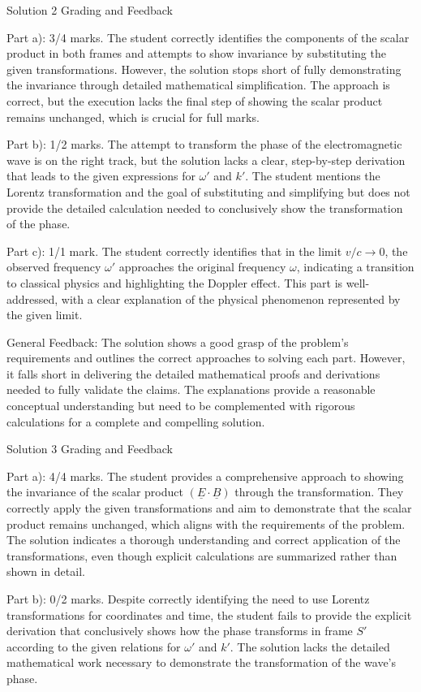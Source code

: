 \documentclass[a4paper,11pt]{article}
\begin{document}
Solution 2 Grading and Feedback

Part a): 3/4 marks. The student correctly identifies the components of the scalar product in both frames and attempts to show invariance by substituting the given transformations. However, the solution stops short of fully demonstrating the invariance through detailed mathematical simplification. The approach is correct, but the execution lacks the final step of showing the scalar product remains unchanged, which is crucial for full marks.

Part b): 1/2 marks. The attempt to transform the phase of the electromagnetic wave is on the right track, but the solution lacks a clear, step-by-step derivation that leads to the given expressions for \( \omega' \) and \( k' \). The student mentions the Lorentz transformation and the goal of substituting and simplifying but does not provide the detailed calculation needed to conclusively show the transformation of the phase.

Part c): 1/1 mark. The student correctly identifies that in the limit \( v/c \rightarrow 0\), the observed frequency \( \omega' \) approaches the original frequency \( \omega \), indicating a transition to classical physics and highlighting the Doppler effect. This part is well-addressed, with a clear explanation of the physical phenomenon represented by the given limit.

General Feedback: The solution shows a good grasp of the problem's requirements and outlines the correct approaches to solving each part. However, it falls short in delivering the detailed mathematical proofs and derivations needed to fully validate the claims. The explanations provide a reasonable conceptual understanding but need to be complemented with rigorous calculations for a complete and compelling solution.

Solution 3 Grading and Feedback

Part a): 4/4 marks. The student provides a comprehensive approach to showing the invariance of the scalar product \( (\underline{E} \cdot \underline{B}) \) through the transformation. They correctly apply the given transformations and aim to demonstrate that the scalar product remains unchanged, which aligns with the requirements of the problem. The solution indicates a thorough understanding and correct application of the transformations, even though explicit calculations are summarized rather than shown in detail.

Part b): 0/2 marks. Despite correctly identifying the need to use Lorentz transformations for coordinates and time, the student fails to provide the explicit derivation that conclusively shows how the phase transforms in frame \( S' \) according to the given relations for \( \omega' \) and \( k' \). The solution lacks the detailed mathematical work necessary to demonstrate the transformation of the wave's phase.
\end{document}
